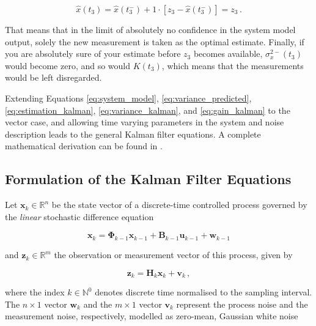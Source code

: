 \begin{equation}\label{eq:prediction_kalman}
  \hat{x}(t_3) = \hat{x}(t^-_3) + 1 \cdot [z_3-\hat{x}(t^-_3)] = z_3\,.
\end{equation}

\noindent
That means that in the limit of absolutely no confidence in the system model output, solely the new measurement is taken as the optimal estimate. Finally, if you are absolutely sure of your estimate before $z_3$ becomes available, $\sigma^{2-}_x(t_3)$ would become zero, and so would $K(t_3)$, which means that the measurements would be left disregarded. 

Extending Equations \ref{eq:system_model}, \ref{eq:variance_predicted}, \ref{eq:estimation_kalman}, \ref{eq:variance_kalman}, and \ref{eq:gain_kalman} to the vector case, and allowing time varying parameters in the system and noise description leads to the general Kalman filter equations. A complete mathematical derivation can be found in \citeauthor{haykin2002adaptive} \cite{haykin2002adaptive}.

\subsection{Formulation of the Kalman Filter Equations} \label{sec:Kalman_equations}

Let $\mathbf{x}_k \in \mathbb{R}^n$ be the state vector of a discrete-time controlled process governed by the \emph{linear} stochastic difference equation 

\begin{equation}\label{eq:time_dynamical_system_plant}
  \mathbf{x}_k = \bm{\Phi}_{k-1}\mathbf{x}_{k-1}+\mathbf{B}_{k-1}\mathbf{u}_{k-1}+\mathbf{w}_{k-1}
\end{equation}

\noindent
and $\mathbf{z}_k \in \mathbb{R}^m$ the observation or measurement vector of this process, given by

\begin{equation}\label{eq:time_dynamical_system_measurement}
  \mathbf{z}_k = \mathbf{H}_{k}\mathbf{x}_{k}+\mathbf{v}_{k}\,,
\end{equation}

\noindent
where the index $k \in \mathbb{N}^0$ denotes discrete time normalised to the sampling interval. The $n\times1$ vector $\mathbf{w}_k$ and the $m\times1$ vector $\mathbf{v}_k$ represent the process noise and the measurement noise, respectively, modelled as zero-mean, Gaussian white noise

